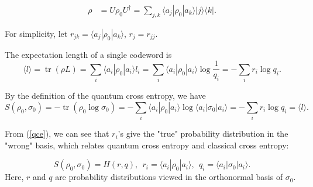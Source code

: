 \documentclass[11pt]{article}
\DeclareMathOperator{\tr}{\text{tr}}
\begin{document}
\begin{equation}
\begin{split}
    \rho &= U \rho_0 U^{\dagger}
    = \sum_{j,k} \langle a_j |\rho_0|a_k \rangle |j\rangle \langle k|.
\end{split}
\end{equation}

For simplicity, let $r_{j k} = \langle a_j |\rho_0 |a_k \rangle$, $r_j = r_{j j}$.

\begin{comment}
In particular, the diagonal elements of $\rho$ are
\begin{equation}
    \rho_{j j} = \langle a_j |\rho_0| a_j \rangle.
\end{equation}

For any matrix $\rho$, its corresponding diagonal matrix $\rho_{\text{diag}}$, and length operator $L$, we have

\begin{equation}
    \tr(\rho L)
    = \tr(\rho_{\text{diag}} L).
\end{equation}

Hence, the average length of code $\langle l \rangle = \tr(\rho L)$ is independent of the off-diagonal elements of $\rho$. 
\end{comment}

The expectation length of a single codeword is
\begin{equation}
    \langle l \rangle = \tr(\rho L)
    = \sum_i \langle a_i |\rho_0| a_i \rangle l_i
    = \sum_i \langle a_i |\rho_0| a_i \rangle \log \frac{1}{q_i} 
    = -\sum_i r_i \log q_i .
\end{equation}

By the definition of the quantum cross entropy, we have
\begin{equation}
\label{qce}
    S(\rho_0, \sigma_0) = -\tr (\rho_0 \log \sigma_0)
    = - \sum_i \langle a_i | \rho_0 | a_i \rangle
     \log \langle a_i | \sigma_0 | a_i \rangle = -\sum_i r_i \log q_i = \langle l \rangle.
\end{equation}

From (\ref{qce}), we can see that $r_i$'s give the "true" probability distribution in the "wrong" basis, which relates quantum cross entropy and classical cross entropy:

\begin{equation}
    S(\rho_0, \sigma_0) = H(r,q), \ \ r_i = \langle a_i | \rho_0 | a_i \rangle, \ \ q_i = \langle a_i | \sigma_0 | a_i \rangle.
\end{equation}
Here, $r$ and $q$ are probability distributions viewed in the orthonormal basis of $\sigma_0$.
\end{document}
